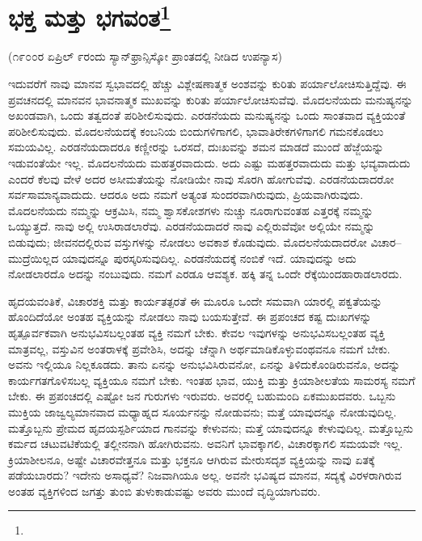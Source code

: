 
\chapter[ಭಕ್ತ ಮತ್ತು ಭಗವಂತ]{ಭಕ್ತ ಮತ್ತು ಭಗವಂತ\protect\footnote{}}

\begin{center}
(೧೯೦೦ರ ಏಪ್ರಿಲ್ ೯ರಂದು ಸ್ಯಾನ್‌ಫ್ರಾನ್ಸಿಸ್ಕೋ ಪ್ರಾಂತದಲ್ಲಿ ನೀಡಿದ ಉಪನ್ಯಾಸ)
\end{center}

ಇದುವರೆಗೆ ನಾವು ಮಾನವ ಸ್ವಭಾವದಲ್ಲಿ ಹೆಚ್ಚು ವಿಶ್ಲೇಷಣಾತ್ಮಕ ಅಂಶವನ್ನು ಕುರಿತು ಪರ್ಯಾಲೋಚಿಸುತ್ತಿದ್ದೆವು. ಈ ಪ್ರವಚನದಲ್ಲಿ ಮಾನವನ ಭಾವನಾತ್ಮಕ ಮುಖವನ್ನು ಕುರಿತು ಪರ್ಯಾಲೋಚಿಸುವೆವು. ಮೊದಲನೆಯದು ಮನುಷ್ಯನನ್ನು ಅಖಂಡವಾಗಿ, ಒಂದು ತತ್ವದಂತೆ ಪರಿಶೀಲಿಸುವುದು. ಎರಡನೆಯದು ಮನುಷ್ಯನನ್ನು ಒಂದು ಸಾಂತವಾದ ವ್ಯಕ್ತಿಯಂತೆ ಪರಿಶೀಲಿಸುವುದು. ಮೊದಲನೆಯದಕ್ಕೆ ಕಂಬನಿಯ ಬಿಂದುಗಳಿಗಾಗಲಿ, ಭಾವಾತಿರೇಕಗಳಿಗಾಗಲಿ ಗಮನಕೊಡಲು ಸಮಯವಿಲ್ಲ. ಎರಡನೆಯದಾದರೂ ಕಣ್ಣೀರನ್ನು ಒರಸದೆ, ದುಃಖವನ್ನು ಶಮನ ಮಾಡದೆ ಮುಂದೆ ಹೆಜ್ಜೆಯನ್ನು ಇಡುವಂತೆಯೇ ಇಲ್ಲ. ಮೊದಲನೆಯದು ಮಹತ್ತರವಾದುದು. ಅದು ಎಷ್ಟು ಮಹತ್ತರವಾದುದು ಮತ್ತು ಭವ್ಯವಾದುದು ಎಂದರೆ ಕೆಲವು ವೇಳೆ ಅದರ ಅಸೀಮತೆಯನ್ನು ನೋಡಿಯೇ ನಾವು ಸೊರಗಿ ಹೋಗುವೆವು. ಎರಡನೆಯದಾದರೋ ಸರ್ವಸಾಮಾನ್ಯವಾದುದು. ಆದರೂ ಅದು ನಮಗೆ ಅತ್ಯಂತ ಸುಂದರವಾಗಿರುವುದು, ಪ್ರಿಯವಾಗಿರುವುದು. ಮೊದಲನೆಯದು ನಮ್ಮನ್ನು ಆಕ್ರಮಿಸಿ, ನಮ್ಮ ಶ್ವಾಸಕೋಶಗಳು ನುಚ್ಚು ನೂರಾಗುವಂತಹ ಎತ್ತರಕ್ಕೆ ನಮ್ಮನ್ನು ಒಯ್ಯುತ್ತದೆ. ನಾವು ಅಲ್ಲಿ ಉಸಿರಾಡಲಾರೆವು. ಎರಡನೆಯದಾದರೆ ನಾವು ಎಲ್ಲಿರುವೆವೋ ಅಲ್ಲಿಯೇ ನಮ್ಮನ್ನು ಬಿಡುವುದು; ಜೀವನದಲ್ಲಿರುವ ವಸ್ತುಗಳನ್ನು ನೋಡಲು ಅವಕಾಶ ಕೊಡುವುದು. ಮೊದಲನೆಯದಾದರೋ ವಿಚಾರ–ಮುದ್ರೆಯಿಲ್ಲದ ಯಾವುದನ್ನೂ ಪುರಸ್ಕರಿಸುವುದಿಲ್ಲ. ಎರಡನೆಯದಕ್ಕೆ ನಂಬಿಕೆ ಇದೆ. ಯಾವುದನ್ನು ಅದು ನೋಡಲಾರದೊ ಅದನ್ನು ನಂಬುವುದು. ನಮಗೆ ಎರಡೂ ಆವಶ್ಯಕ. ಹಕ್ಕಿ ತನ್ನ ಒಂದೇ ರೆಕ್ಕೆಯಿಂದ\break ಹಾರಾಡಲಾರದು.

ಹೃದಯವಂತಿಕೆ, ವಿಚಾರಶಕ್ತಿ ಮತ್ತು ಕಾರ್ಯತತ್ಪರತೆ ಈ ಮೂರೂ ಒಂದೇ ಸಮವಾಗಿ ಯಾರಲ್ಲಿ ಪಕ್ವತೆಯನ್ನು ಹೊಂದಿದೆಯೋ ಅಂತಹ ವ್ಯಕ್ತಿಯನ್ನು ನೋಡಲು ನಾವು ಬಯಸುತ್ತೇವೆ. ಈ ಪ್ರಪಂಚದ ಕಷ್ಟ ದುಃಖಗಳನ್ನು ಹೃತ್ಪೂರ್ವಕವಾಗಿ ಅನುಭವಿಸಬಲ್ಲಂತಹ ವ್ಯಕ್ತಿ ನಮಗೆ ಬೇಕು. ಕೇವಲ ಇವುಗಳನ್ನು ಅನುಭವಿಸಬಲ್ಲಂತಹ ವ್ಯಕ್ತಿ ಮಾತ್ರವಲ್ಲ, ವಸ್ತುವಿನ ಅಂತರಾಳಕ್ಕೆ ಪ್ರವೇಶಿಸಿ, ಅದನ್ನು ಚೆನ್ನಾಗಿ ಅರ್ಥಮಾಡಿಕೊಳ್ಳುವಂಥವನೂ ನಮಗೆ ಬೇಕು. ಅವನು ಇಲ್ಲಿಯೂ ನಿಲ್ಲಕೂಡದು. ತಾನು ಏನನ್ನು ಅನುಭವಿಸಿರುವನೋ, ಏನನ್ನು ತಿಳಿದುಕೊಂಡಿರುವನೊ, ಅದನ್ನು ಕಾರ್ಯಗತಗೊಳಿಸಬಲ್ಲ ವ್ಯಕ್ತಿಯೂ ನಮಗೆ ಬೇಕು. ಇಂತಹ ಭಾವ, ಯುಕ್ತಿ ಮತ್ತು ಕ್ರಿಯಾಶೀಲತೆಯ ಸಾಮರಸ್ಯ ನಮಗೆ ಬೇಕು. ಈ ಪ್ರಪಂಚದಲ್ಲಿ ಎಷ್ಟೋ ಜನ ಗುರುಗಳು ಇರುವರು. ಅವರಲ್ಲಿ ಬಹುಮಂದಿ ಏಕಮುಖದವರು. ಒಬ್ಬನು ಮುಕ್ತಿಯ ಜಾಜ್ವಲ್ಯಮಾನವಾದ ಮಧ್ಯಾಹ್ನದ ಸೂರ್ಯನನ್ನು ನೋಡುವನು; ಮತ್ತೆ ಯಾವುದನ್ನೂ ನೋಡುವುದಿಲ್ಲ. ಮತ್ತೊಬ್ಬನು ಪ್ರೇಮದ ಹೃದಯಸ್ಪರ್ಶಿಯಾದ ಗಾನವನ್ನು ಕೇಳುವನು; ಮತ್ತೆ ಯಾವುದನ್ನೂ ಕೇಳುವುದಿಲ್ಲ. ಮತ್ತೊಬ್ಬನು ಕರ್ಮದ ಚಟುವಟಿಕೆಯಲ್ಲಿ ತಲ್ಲೀನನಾಗಿ ಹೋಗಿರುವನು. ಅವನಿಗೆ ಭಾವಕ್ಕಾಗಲಿ, ವಿಚಾರಕ್ಕಾಗಲಿ ಸಮಯವೇ ಇಲ್ಲ. ಕ್ರಿಯಾಶೀಲನೂ, ಅಷ್ಟೇ ವಿಚಾರವೇತ್ತನೂ ಮತ್ತು ಭಕ್ತನೂ ಆಗಿರುವ ಮೇರುಸದೃಶ ವ್ಯಕ್ತಿಯನ್ನು ನಾವು ಏತಕ್ಕೆ ಪಡೆಯಬಾರದು? ಇದೇನು ಅಸಾಧ್ಯವೆ? ನಿಜವಾಗಿಯೂ ಅಲ್ಲ. ಅವನೇ ಭವಿಷ್ಯದ ಮಾನವ, ಸದ್ಯಕ್ಕೆ ವಿರಳರಾಗಿರುವ ಅಂತಹ ವ್ಯಕ್ತಿಗಳಿಂದ ಜಗತ್ತು ತುಂಬಿ ತುಳುಕಾಡುವಷ್ಟು ಅವರು ಮುಂದೆ ವೃದ್ಧಿಯಾಗುವರು.

